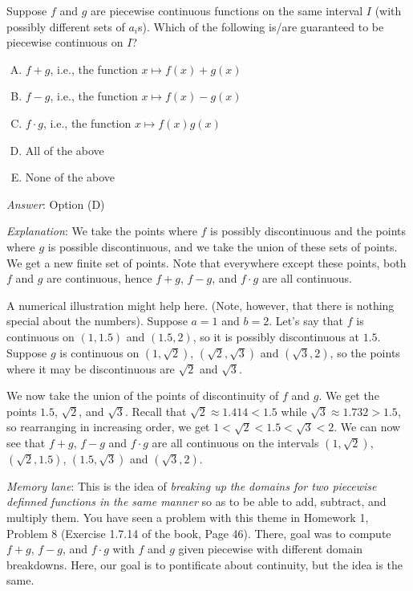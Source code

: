 \documentclass[10pt]{amsart}
\begin{document}
\begin{enumerate}
  Suppose $f$ and $g$ are piecewise continuous functions on the same
  interval $I$ (with possibly different sets of $a_i$s). Which of the
  following is/are guaranteed to be piecewise continuous on $I$?

  \begin{enumerate}[(A)]
  \item $f + g$, i.e., the function $x \mapsto f(x) + g(x)$
  \item $f - g$, i.e., the function $x \mapsto f(x) - g(x)$
  \item $f \cdot g$, i.e., the function $x \mapsto f(x)g(x)$
  \item All of the above
  \item None of the above
  \end{enumerate}

  {\em Answer}: Option (D)

  {\em Explanation}: We take the points where $f$ is possibly
  discontinuous and the points where $g$ is possible discontinuous,
  and we take the union of these sets of points. We get a new finite
  set of points. Note that everywhere except these points, both $f$
  and $g$ are continuous, hence $f + g$, $f - g$, and $f \cdot g$ are
  all continuous.

  A numerical illustration might help here. (Note, however, that there
  is nothing special about the numbers). Suppose $a = 1$ and $b =
  2$. Let's say that $f$ is continuous on $(1,1.5)$ and $(1.5,2)$, so
  it is possibly discontinuous at $1.5$. Suppose $g$ is continuous on
  $(1,\sqrt{2})$, $(\sqrt{2},\sqrt{3})$ and $(\sqrt{3},2)$, so the
  points where it may be discontinuous are $\sqrt{2}$ and $\sqrt{3}$.

  We now take the union of the points of discontinuity of $f$ and
  $g$. We get the points $1.5$, $\sqrt{2}$, and $\sqrt{3}$. Recall
  that $\sqrt{2} \approx 1.414 < 1.5$ while $\sqrt{3} \approx 1.732 >
  1.5$, so rearranging in increasing order, we get $1 < \sqrt{2} < 1.5
  < \sqrt{3} < 2$. We can now see that $f + g$, $f - g$ and $f \cdot
  g$ are all continuous on the intervals $(1,\sqrt{2})$,
  $(\sqrt{2},1.5)$, $(1.5,\sqrt{3})$ and $(\sqrt{3},2)$.

  {\em Memory lane}: This is the idea of {\em breaking up the domains
  for two piecewise definned functions in the same manner} so as to be
  able to add, subtract, and multiply them. You have seen a problem
  with this theme in Homework 1, Problem 8 (Exercise 1.7.14 of the
  book, Page 46). There, goal was to compute $f + g$, $f - g$, and $f
  \cdot g$ with $f$ and $g$ given piecewise with different domain
  breakdowns. Here, our goal is to pontificate about continuity, but
  the idea is the same.


\end{enumerate}
\end{document}
